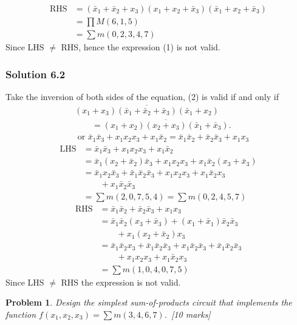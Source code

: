 \documentclass[twocolumn]{article}
\newtheorem{prob}{Problem}
\newcommand{\bx}{\bar{x}}
\begin{document}
    \begin{align*}
      \text{RHS} &= (\bx_1 + \bx_2 + x_3)(x_1 + x_2 + \bx_3)(\bx_1 + x_2 + \bx_3)
      \\
                 &= \prod M(6, 1, 5)
      \\
      &= \sum m(0, 2, 3, 4, 7)
    \end{align*}
    Since LHS $\ne$ RHS, hence the expression (1) is not valid.

\subsubsection*{Solution 6.2}
Take the inversion of both sides of the equation, (2) is valid if and only if
%
\begin{align*}
  &\overline{(x_1 + x_3)(\bx_1 + \bx_2 + \bx_3)(\bx_1 + x_2)}
  \\
  &\qquad = \overline{(x_1 + x_2)(x_2 + x_3)(\bx_1 + \bx_3)}.
  \\
  &\text{ or } \bx_1\bx_3 + x_1x_2x_3 + x_1\bx_2 = \bx_1\bx_2 + \bx_2\bx_3 + x_1x_3
\end{align*}%
% 
%
\begin{align*}
\text{LHS} &= \bx_1\bx_3 + x_1x_2x_3 + x_1\bx_2
  \\
           &= \bx_1 (x_2 + \bx_2)\bx_3 + x_1x_2x_3 + x_1\bx_2(x_3 + \bx_3)
  \\
           &= \bx_1 x_2\bx_3 + \bx_1\bx_2 \bx_3 + x_1 x_2 x_3 + x_1 \bx_2 x_3
  \\
             &\qquad + x_1\bx_2 \bx_3
  \\
           &= \sum m(2, 0, 7, 5, 4) = \sum m(0, 2, 4, 5, 7)
\end{align*}%
% 
%
\begin{align*}
\text{RHS} &= \bx_1 \bx_2 + \bx_2 \bx_3 + x_1 x_3
  \\
           &= \bx_1 \bx_2 (x_3 + \bx_3) + (x_1 + \bx_1) \bx_2 \bx_3
  \\
  &\qquad + x_1 (x_2 + \bx_2) x_3
  \\
           &= \bx_1 \bx_2 x_3 + \bx_1 \bx_2 \bx_3 + x_1 \bx_2 \bx_3 + \bx_1 \bx_2 \bx_3
  \\
  &\qquad + x_1 x_2 x_3 + x_1 \bx_2 x_3
  \\
           &= \sum m(1, 0, 4, 0, 7, 5)
\end{align*}%
% 
Since LHS $\ne$ RHS the expression is not valid.


\begin{prob}
Design the simplest sum-of-products circuit that implements the function $f (x_1 , x_2 , x_3 ) = \sum m(3, 4, 6, 7)$.~\cite[Prob 2.21]{brown2013fundamentals}[10 marks]
\end{prob}
\end{document}
